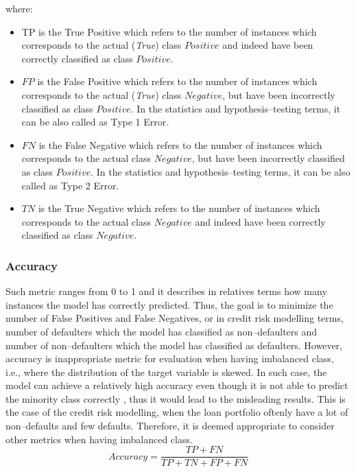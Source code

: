 where:
\begin{itemize}\setlength\itemsep{0em}
    \item TP is the True Positive which refers to the number of instances which corresponds to the actual (\textit{True}) class $Positive$ and indeed have been correctly classified as class $Positive$.
	\item $FP$ is the False Positive which refers to the number of instances which corresponds to the actual (\textit{True}) class $Negative$, but have been incorrectly classified as class $Positive$. In the statistics and hypothesis--testing terms, it can be also called as Type 1 Error.
	\item $FN$ is the False Negative which refers to the number of instances which corresponds to the actual class $Negative$, but have been incorrectly classified as class $Positive$. In the statistics and hypothesis--testing terms, it can be also called as Type 2 Error.
	\item $TN$ is the True Negative which refers to the number of instances which corresponds to the actual class $Negative$ and indeed have been correctly classified as class $Negative$.
\end{itemize}

\subsubsection{Accuracy}
Such metric ranges from 0 to 1 and it describes in relatives terms how many instances the model has correctly predicted. Thus, the goal is to minimize the number of False Positives and False Negatives, or in credit risk modelling terms, number of defaulters which the model has classified as non--defaulters and number of non--defaulters which the model has classified as defaulters.
However, accuracy is inappropriate metric for evaluation when having imbalanced class, i.e., where the distribution of the target variable is skewed.
In such case, the model can achieve a relatively high accuracy even though it is not able to predict the minority class correctly \citep{brownlee2021failure}, thus it would lead to the misleading results.
This is the case of the credit risk modelling, when the loan portfolio oftenly have a lot of non--defaults and few defaults.
Therefore, it is deemed appropriate to consider other metrics when having imbalanced class.
\begin{equation}\label{eq}
    Accuracy = \frac{TP + FN}{TP + TN + FP + FN}
\end{equation}

